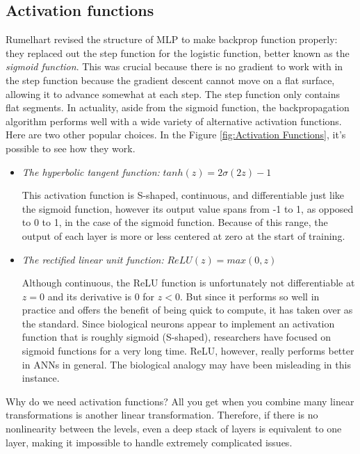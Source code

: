 \subsection{Activation functions}
Rumelhart revised the structure of MLP to make backprop function properly: they replaced out the step function for the logistic function, better known as the \textit{sigmoid function}. This was crucial because there is no gradient to work with in the step function because the gradient descent cannot move on a flat surface, allowing it to advance somewhat at each step. The step function only contains flat segments. In actuality, aside from the sigmoid function, the backpropagation algorithm performs well with a wide variety of alternative activation functions. Here are two other popular choices. In the Figure \ref{fig:Activation Functions}, it's possible to see how they work.
\begin{itemize}
    \item \textit{The hyperbolic tangent function:} $tanh(z) = 2\sigma(2z) - 1$

    This activation function is S-shaped, continuous, and differentiable just like the sigmoid function, however its output value spans from -1 to 1, as opposed to 0 to 1, in the case of the sigmoid function. Because of this range, the output of each layer is more or less centered at zero at the start of training.

    \item \textit{The rectified linear unit function:} $ReLU(z) = max(0, z)$

    Although continuous, the ReLU function is unfortunately not differentiable at $z = 0$ and its derivative is $0$ for $z < 0$. But since it performs so well in practice and offers the benefit of being quick to compute, it has taken over as the standard. Since biological neurons appear to implement an activation function that is roughly sigmoid (S-shaped), researchers have focused on sigmoid functions for a very long time. ReLU, however, really performs better in ANNs in general. The biological analogy may have been misleading in this instance.
\end{itemize}
Why do we need activation functions? All you get when you combine many linear transformations is another linear transformation. Therefore, if there is no nonlinearity between the levels, even a deep stack of layers is equivalent to one layer, making it impossible to handle extremely complicated issues.

